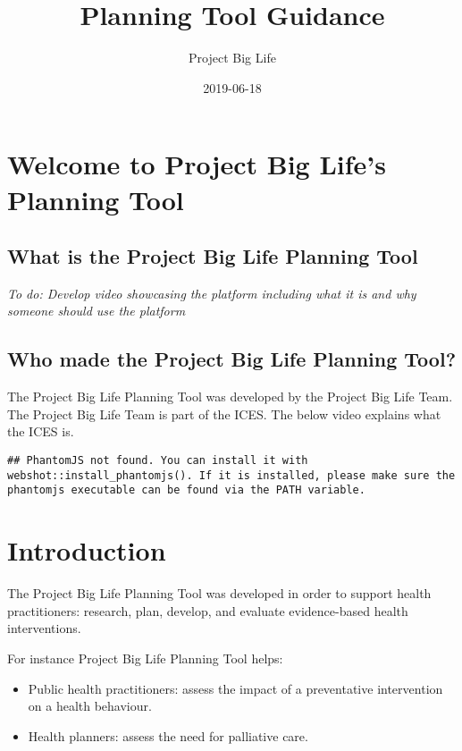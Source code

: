 \documentclass[]{book}
\title{Planning Tool Guidance}
\author{Project Big Life}
\date{2019-06-18}
\providecommand{\tightlist}{%
  \setlength{\itemsep}{0pt}\setlength{\parskip}{0pt}}
\begin{document}
\maketitle

{
\setcounter{tocdepth}{1}
\tableofcontents
}
\chapter{Welcome to Project Big Life's Planning
Tool}\label{welcome-to-project-big-lifes-planning-tool}

\section{What is the Project Big Life Planning
Tool}\label{what-is-the-project-big-life-planning-tool}

\emph{To do: Develop video showcasing the platform including what it is
and why someone should use the platform}

\section{Who made the Project Big Life Planning
Tool?}\label{who-made-the-project-big-life-planning-tool}

The Project Big Life Planning Tool was developed by the Project Big Life
Team. The Project Big Life Team is part of the ICES. The below video
explains what the ICES is.

\begin{verbatim}
## PhantomJS not found. You can install it with webshot::install_phantomjs(). If it is installed, please make sure the phantomjs executable can be found via the PATH variable.
\end{verbatim}

\chapter{Introduction}\label{introduction}

The Project Big Life Planning Tool was developed in order to support
health practitioners: research, plan, develop, and evaluate
evidence-based health interventions.

For instance Project Big Life Planning Tool helps:

\begin{itemize}
\tightlist
\item
  Public health practitioners: assess the impact of a preventative
  intervention on a health behaviour.
\item
  Health planners: assess the need for palliative care.
\end{itemize}
\end{document}
